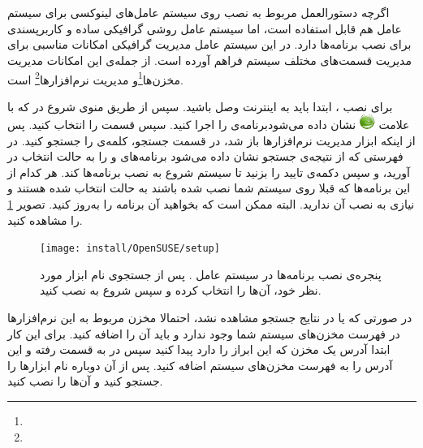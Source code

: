 \section{}

اگرچه دستورالعمل مربوط به نصب  روی سیستم عامل‌های لینوکسی برای سیستم عامل  هم قابل استفاده است، 
اما سیستم عامل  روشی گرافیکی ساده و کاربرپسندی برای نصب برنامه‌ها دارد. 
در این سیستم عامل مدیریت گرافیکی  امکانات مناسبی برای مدیریت قسمت‌های مختلف سیستم فراهم آورده است. 
از جمله‌ی این امکانات مدیریت مخزن‌ها\footnote{}و مدیریت نرم‌افزارها\footnote{}
است.

برای نصب ، ابتدا باید به اینترنت وصل باشید. سپس از طریق منوی شروع در  که با علامت 
\includegraphics[width=0.5cm]{image/opensuse} نشان داده می‌شودبرنامه‌ی  را اجرا کنید. سپس قسمت  را انتخاب کنید. پس از اینکه ابزار 
مدیریت نرم‌افزارها باز شد، در قسمت جستجو، کلمه‌ی  را جستجو کنید. در فهرستی که از نتیجه‌ی جستجو نشان داده می‌شود برنامه‌های 
 و  را به حالت انتخاب در آورید، و سپس دکمه‌ی تایید را بزنید تا سیستم شروع به نصب 
برنامه‌ها کند. هر کدام از این برنامه‌ها که قبلا روی سیستم شما نصب شده باشند به حالت انتخاب شده هستند و نیازی
به نصب آن ندارید. البته ممکن است که بخواهید آن برنامه را به‌روز کنید. تصویر \ref{install/OpenSUSE/setup} را مشاهده کنید.

\begin{figure}
 \centering
\texttt{[image: install/OpenSUSE/setup]}
\caption[پنجره‌ی نصب برنامه‌ها در سیستم عامل .]{
پنجره‌ی نصب برنامه‌ها در سیستم عامل . پس از جستجوی نام ابزار مورد
نظر خود، آن‌ها را انتخاب کرده و سپس شروع به نصب کنید.
}
\label{install/OpenSUSE/setup}
\end{figure}

در صورتی که  یا  در نتایج جستجو مشاهده نشد، احتمالا
مخزن مربوط به این نرم‌افزارها در فهرست مخزن‌های سیستم شما وجود ندارد و باید آن
را اضافه کنید. برای این کار ابتدا آدرس یک مخزن که این ابراز را دارد پیدا کنید
سپس در  به قسمت  رفته و این آدرس را به فهرست
مخزن‌های سیستم اضافه کنید. پس از آن دوباره نام ابزارها را جستجو کنید و آن‌ها را
نصب کنید.

